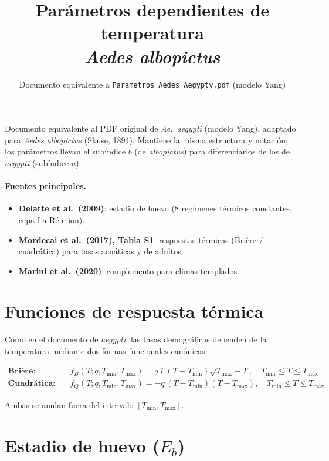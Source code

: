 \documentclass[11pt,a4paper]{article}
\title{Par\'ametros dependientes de temperatura\\\textit{Aedes albopictus}}
\author{Documento equivalente a \texttt{Parametros Aedes Aegypty.pdf} (modelo Yang)}
\date{}
\begin{document}
\maketitle

\noindent Documento equivalente al PDF original de \textit{Ae.\ aegypti} (modelo Yang),
adaptado para \textit{Aedes albopictus} (Skuse, 1894). Mantiene la misma estructura y
notaci\'on; los par\'ametros llevan el sub\'indice \textbf{$b$} (de \textit{albopictus})
para diferenciarlos de los de \textit{aegypti} (sub\'indice $a$).

\paragraph{Fuentes principales.}
\begin{itemize}
  \item \textbf{Delatte et al.\ (2009)}: estadio de huevo (8 reg\'imenes t\'ermicos
        constantes, cepa La R\'eunion).
  \item \textbf{Mordecai et al.\ (2017), Tabla S1}: respuestas t\'ermicas
        (Bri\`ere / cuadr\'atica) para tasas acu\'aticas y de adultos.
  \item \textbf{Marini et al.\ (2020)}: complemento para climas templados.
\end{itemize}

\section*{Funciones de respuesta t\'ermica}

Como en el documento de \textit{aegypti}, las tasas demogr\'aficas dependen de la
temperatura mediante dos formas funcionales can\'onicas:

\begin{align*}
\textbf{Bri\`ere:}\quad & f_B(T;q,T_{\min},T_{\max}) = q\,T\,(T-T_{\min})\sqrt{T_{\max}-T},
\quad T_{\min}\le T \le T_{\max} \\
\textbf{Cuadr\'atica:}\quad & f_Q(T;q,T_{\min},T_{\max}) = -q\,(T-T_{\min})(T-T_{\max}),
\quad T_{\min}\le T \le T_{\max}
\end{align*}

\noindent Ambas se anulan fuera del intervalo $[T_{\min},T_{\max}]$.

\section{Estadio de huevo (\texorpdfstring{$E_b$}{Eb})}
\end{document}
